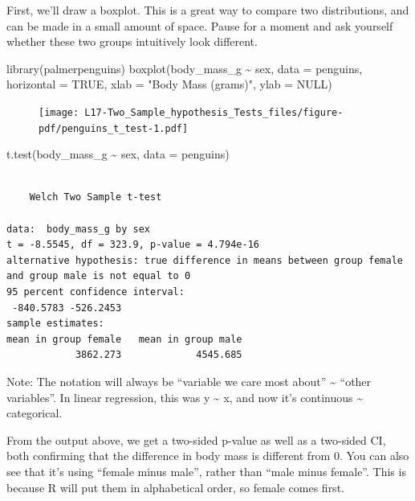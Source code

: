 \documentclass[
  letterpaper,
  DIV=11,
  numbers=noendperiod,
  oneside]{scrreprt}
\newenvironment{Shaded}{\begin{snugshade}}{\end{snugshade}}
\newcommand{\AttributeTok}[1]{\textcolor[rgb]{0.40,0.45,0.13}{#1}}
\newcommand{\ConstantTok}[1]{\textcolor[rgb]{0.56,0.35,0.01}{#1}}
\newcommand{\FunctionTok}[1]{\textcolor[rgb]{0.28,0.35,0.67}{#1}}
\newcommand{\NormalTok}[1]{\textcolor[rgb]{0.00,0.23,0.31}{#1}}
\newcommand{\SpecialCharTok}[1]{\textcolor[rgb]{0.37,0.37,0.37}{#1}}
\newcommand{\StringTok}[1]{\textcolor[rgb]{0.13,0.47,0.30}{#1}}
\begin{document}
First, we'll draw a boxplot. This is a great way to compare two
distributions, and can be made in a small amount of space. Pause for a
moment and ask yourself whether these two groups intuitively look
different.

\begin{Shaded}
\begin{Highlighting}[]
\FunctionTok{library}\NormalTok{(palmerpenguins)}
\FunctionTok{boxplot}\NormalTok{(body\_mass\_g }\SpecialCharTok{\textasciitilde{}}\NormalTok{ sex, }\AttributeTok{data =}\NormalTok{ penguins, }\AttributeTok{horizontal =} \ConstantTok{TRUE}\NormalTok{,}
    \AttributeTok{xlab =} \StringTok{"Body Mass (grams)"}\NormalTok{, }\AttributeTok{ylab =} \ConstantTok{NULL}\NormalTok{)}
\end{Highlighting}
\end{Shaded}

\begin{figure}[H]

{\centering \texttt{[image: L17-Two\_Sample\_hypothesis\_Tests\_files/figure-pdf/penguins\_t\_test-1.pdf]}

}

\end{figure}

\begin{Shaded}
\begin{Highlighting}[]
\FunctionTok{t.test}\NormalTok{(body\_mass\_g }\SpecialCharTok{\textasciitilde{}}\NormalTok{ sex, }\AttributeTok{data =}\NormalTok{ penguins)}
\end{Highlighting}
\end{Shaded}

\begin{verbatim}

    Welch Two Sample t-test

data:  body_mass_g by sex
t = -8.5545, df = 323.9, p-value = 4.794e-16
alternative hypothesis: true difference in means between group female and group male is not equal to 0
95 percent confidence interval:
 -840.5783 -526.2453
sample estimates:
mean in group female   mean in group male 
            3862.273             4545.685 
\end{verbatim}

Note: The notation will always be ``variable we care most about''
\textasciitilde{} ``other variables''. In linear regression, this was y
\textasciitilde{} x, and now it's continuous \textasciitilde{}
categorical.

From the output above, we get a two-sided p-value as well as a two-sided
CI, both confirming that the difference in body mass is different from
0. You can also see that it's using ``female minus male'', rather than
``male minus female''. This is because R will put them in alphabetical
order, so female comes first.
\end{document}
